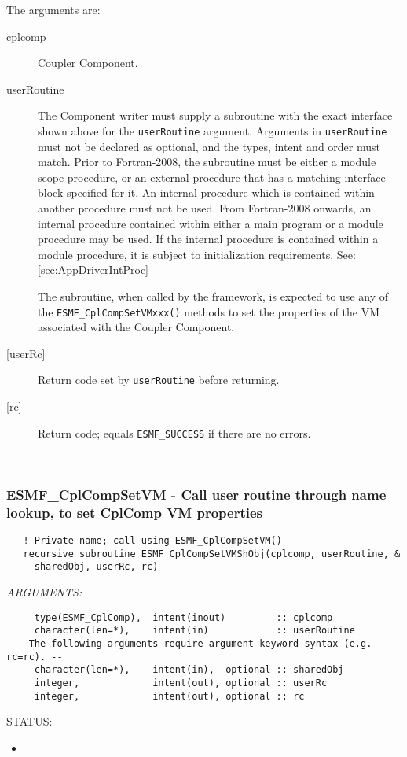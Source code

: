   The arguments are:
   \begin{description}
   \item[cplcomp]
     Coupler Component.
   \item[userRoutine]
     The Component writer must supply a subroutine with the exact interface
     shown above for the {\tt userRoutine} argument. Arguments in {\tt userRoutine}
     must not be declared as optional, and the types, intent and order must match.
     Prior to Fortran-2008, the subroutine must be either a module scope procedure,
     or an external procedure that has a matching interface block specified for it.
     An internal procedure which is contained within another procedure must not be used.
     From Fortran-2008 onwards, an internal procedure contained within either a main program
     or a module procedure may be used.  If the internal procedure is contained within a
     module procedure, it is subject to initialization requirements.  See: \ref{sec:AppDriverIntProc}
  
     The subroutine, when called by the framework, is expected to use any of the
     {\tt ESMF\_CplCompSetVMxxx()} methods to set the properties of the VM
     associated with the Coupler Component.
   \item[{[userRc]}]
     Return code set by {\tt userRoutine} before returning.
   \item[{[rc]}]
     Return code; equals {\tt ESMF\_SUCCESS} if there are no errors.
   \end{description}
   
 
\mbox{}\hrulefill\ 
 
\subsubsection [ESMF\_CplCompSetVM] {ESMF\_CplCompSetVM - Call user routine through name lookup, to set CplComp VM properties}


\begin{verbatim}   ! Private name; call using ESMF_CplCompSetVM()
   recursive subroutine ESMF_CplCompSetVMShObj(cplcomp, userRoutine, &
     sharedObj, userRc, rc)\end{verbatim}{\em ARGUMENTS:}
\begin{verbatim}     type(ESMF_CplComp),  intent(inout)         :: cplcomp
     character(len=*),    intent(in)            :: userRoutine
 -- The following arguments require argument keyword syntax (e.g. rc=rc). --
     character(len=*),    intent(in),  optional :: sharedObj
     integer,             intent(out), optional :: userRc
     integer,             intent(out), optional :: rc\end{verbatim}
{\sf STATUS:}
   \begin{itemize}
   \item{}
   \end{itemize}
  
